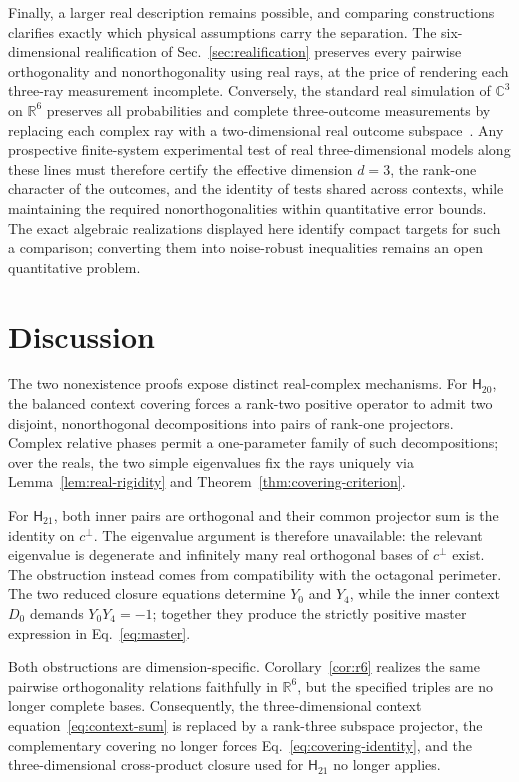 \documentclass[twocolumn,aps,pra,floatfix,amsmath,amssymb,longbibliography]{revtex4-2}
\newenvironment{handrewrite}{\leavevmode\color{blue}}{}
\theoremstyle{definition}
\theoremstyle{remark}
\newcommand{\C}{\mathbb C}
\newcommand{\R}{\mathbb R}
\newcommand{\Htwenty}{\mathsf H_{20}}
\newcommand{\Htwentyone}{\mathsf H_{21}}
\begin{document}
\begin{handrewrite}
Finally, a larger real description remains possible, and comparing
constructions clarifies exactly which physical assumptions carry the
separation.  The six-dimensional realification of Sec.~\ref{sec:realification}
preserves every pairwise orthogonality and nonorthogonality using real rays,
at the price of rendering each three-ray measurement incomplete.  Conversely,
the standard real simulation of $\C^3$ on $\R^6$ preserves all probabilities
and complete three-outcome measurements by replacing each complex ray with a
two-dimensional real outcome
subspace~\cite{McKague2009SimulatingRealHilbert,Aleksandrova2013UniversalQubit}.
Any prospective finite-system experimental test of real three-dimensional
models along these lines must therefore certify the effective dimension
$d=3$, the rank-one character of the outcomes, and the identity of tests
shared across contexts, while maintaining the required nonorthogonalities
within quantitative error bounds.  The exact algebraic realizations displayed
here identify compact targets for such a comparison; converting them into
noise-robust inequalities remains an open quantitative problem.
\end{handrewrite}

\section{Discussion}
\label{sec:discussion}

The two nonexistence proofs expose distinct real-complex mechanisms.
For $\Htwenty$, the balanced context covering forces a rank-two positive
operator to admit two disjoint, nonorthogonal decompositions into pairs of
rank-one projectors.  Complex relative phases permit a one-parameter family
of such decompositions; over the reals, the two simple eigenvalues fix the
rays uniquely via Lemma~\ref{lem:real-rigidity} and
Theorem~\ref{thm:covering-criterion}.

For $\Htwentyone$, both inner pairs are orthogonal and their common
projector sum is the identity on $c^\perp$.  The eigenvalue argument is
therefore unavailable: the relevant eigenvalue is degenerate and infinitely
many real orthogonal bases of $c^\perp$ exist.  The obstruction instead comes
from compatibility with the octagonal perimeter.  The two reduced
closure equations determine $Y_0$ and $Y_4$, while the inner context
$D_0$ demands $Y_0Y_4=-1$; together they produce the strictly positive master
expression in Eq.~\eqref{eq:master}.

Both obstructions are dimension-specific.  Corollary~\ref{cor:r6} realizes the
same pairwise orthogonality relations faithfully in $\R^6$, but the specified
triples are no longer complete bases.  Consequently, the three-dimensional
context equation~\eqref{eq:context-sum} is replaced by a rank-three subspace
projector, the complementary covering no longer forces
Eq.~\eqref{eq:covering-identity}, and the three-dimensional cross-product
closure used for $\Htwentyone$ no longer applies.
\end{document}
